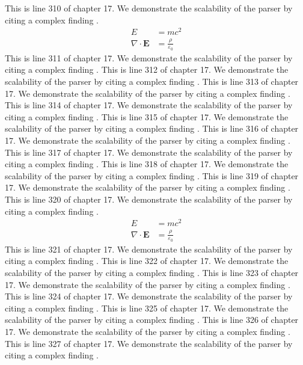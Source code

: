 This is line 310 of chapter 17. We demonstrate the scalability of the parser by citing a complex finding \cite{ref17_310}.
\begin{align*}
  E &= mc^2 \\
  \nabla \cdot \mathbf{E} &= \frac{\rho}{\varepsilon_0}
\end{align*}
This is line 311 of chapter 17. We demonstrate the scalability of the parser by citing a complex finding \cite{ref17_311}.
This is line 312 of chapter 17. We demonstrate the scalability of the parser by citing a complex finding \cite{ref17_312}.
This is line 313 of chapter 17. We demonstrate the scalability of the parser by citing a complex finding \cite{ref17_313}.
This is line 314 of chapter 17. We demonstrate the scalability of the parser by citing a complex finding \cite{ref17_314}.
This is line 315 of chapter 17. We demonstrate the scalability of the parser by citing a complex finding \cite{ref17_315}.
This is line 316 of chapter 17. We demonstrate the scalability of the parser by citing a complex finding \cite{ref17_316}.
This is line 317 of chapter 17. We demonstrate the scalability of the parser by citing a complex finding \cite{ref17_317}.
This is line 318 of chapter 17. We demonstrate the scalability of the parser by citing a complex finding \cite{ref17_318}.
This is line 319 of chapter 17. We demonstrate the scalability of the parser by citing a complex finding \cite{ref17_319}.
This is line 320 of chapter 17. We demonstrate the scalability of the parser by citing a complex finding \cite{ref17_320}.
\begin{align*}
  E &= mc^2 \\
  \nabla \cdot \mathbf{E} &= \frac{\rho}{\varepsilon_0}
\end{align*}
This is line 321 of chapter 17. We demonstrate the scalability of the parser by citing a complex finding \cite{ref17_321}.
This is line 322 of chapter 17. We demonstrate the scalability of the parser by citing a complex finding \cite{ref17_322}.
This is line 323 of chapter 17. We demonstrate the scalability of the parser by citing a complex finding \cite{ref17_323}.
This is line 324 of chapter 17. We demonstrate the scalability of the parser by citing a complex finding \cite{ref17_324}.
This is line 325 of chapter 17. We demonstrate the scalability of the parser by citing a complex finding \cite{ref17_325}.
This is line 326 of chapter 17. We demonstrate the scalability of the parser by citing a complex finding \cite{ref17_326}.
This is line 327 of chapter 17. We demonstrate the scalability of the parser by citing a complex finding \cite{ref17_327}.
